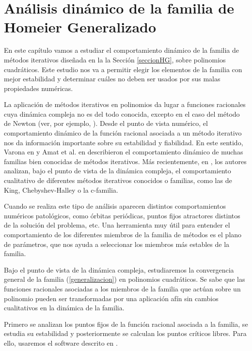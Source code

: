 
\chapter{Análisis dinámico de la familia de Homeier Generalizado}\label{capitulodinamica}
En este capítulo vamos a estudiar el comportamiento dinámico de la familia de métodos iterativos diseñada en la la Sección \ref{seccionHG}, sobre polinomios cuadráticos. Este estudio nos va a permitir elegir los elementos de la familia con mejor estabilidad y determinar cuáles no deben ser usados por sus malas propiedades numéricas.

La aplicación de métodos iterativos en polinomios da lugar a funciones racionales cuya dinámica compleja no es del todo conocida, excepto en el caso del método de Newton (ver, por ejemplo, \cite{blanchard}). Desde el punto de vista numérico, el comportamiento dinámico de la función racional asociada a un método iterativo nos da información importante sobre su estabilidad y fiabilidad. En este sentido, Varona en \cite{Va} y Amat et al. en \cite{Amat3} describieron el comportamiento dinámico de muchas familias bien conocidas de métodos iterativos. Más recientemente, en \cite{ABBP,CCT,CGTVV,CTV,GHR,NCS,SNC}, los autores analizan, bajo el punto de vista de la dinámica compleja, el comportamiento cualitativo de diferentes métodos iterativos conocidos o familias, como las de King, Chebyshev-Halley o la c-familia. 

Cuando se realiza este tipo de análisis aparecen distintos comportamientos numéricos patológicos,
como órbitas periódicas, puntos fijos atractores distintos de la solución del problema, etc. Una herramienta muy útil para entender el comportamiento de los
diferentes miembros de la familia de métodos es el plano de parámetros, que nos ayuda a seleccionar los miembros más estables de la familia. 

Bajo el punto de vista de la dinámica compleja, estudiaremos la convergencia general de la familia (\ref{generalizacion}) en polinomios cuadráticos. Se sabe que las funciones racionales asociadas a los miembros de la familia que actúan sobre un polinomio pueden ser
transformadas por una aplicación afín sin cambios cualitativos en la
dinámica de la familia.

Primero se analizan los puntos fijos de la función racional asociada a la familia, se estudia su estabilidad y posteriormente se calculan los puntos críticos libres. Para ello, usaremos el software descrito en \cite{CCT}.

